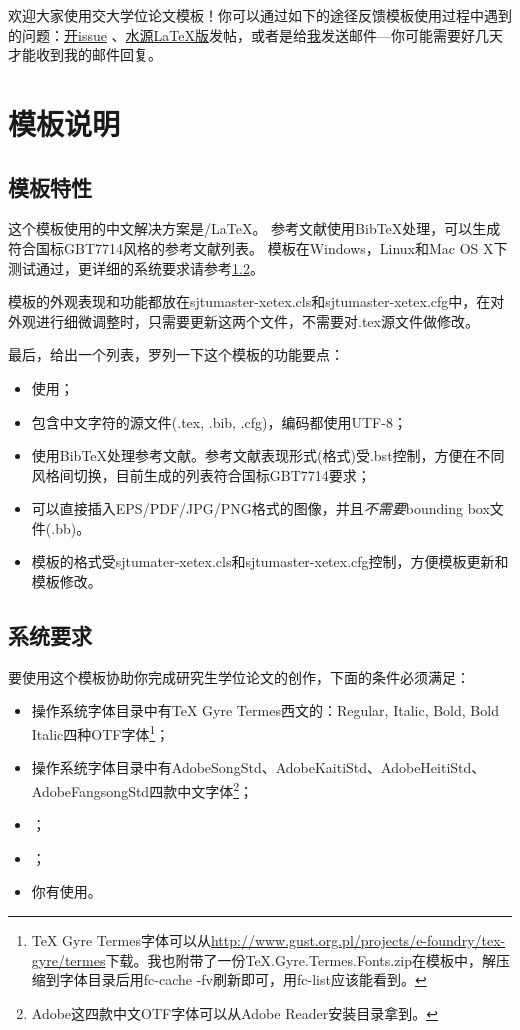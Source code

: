 欢迎大家使用交大学位论文模板！你可以通过如下的途径反馈模板使用过程中遇到的问题：\href{https://github.com/weijianwen/sjtu-thesis-template-latex/issues}{开issue}
、\href{https://bbs.sjtu.edu.cn/bbsdoc?board=TeX_LaTeX}{水源LaTeX版}发帖，或者是给\href{mailto:weijianwen@gmail.com}{我}发送邮件---你可能需要好几天才能收到我的邮件回复。

\section{模板说明}
\subsection{模板特性}
\label{sec:features}

这个模板使用的中文解决方案是\XeTeX/\LaTeX。
参考文献使用BibTeX处理，可以生成符合国标GBT7714风格的参考文献列表。
模板在Windows，Linux和Mac OS X下测试通过，更详细的系统要求请参考\ref{sec:requirements}。

模板的外观表现和功能都放在sjtumaster-xetex.cls和sjtumaster-xetex.cfg中，在对外观进行细微调整时，只需要更新这两个文件，不需要对.tex源文件做修改。

最后，给出一个列表，罗列一下这个模板的功能要点：

\begin{itemize}
\item 使用；
\item 包含中文字符的源文件(.tex, .bib, .cfg)，编码都使用UTF-8；
\item 使用BibTeX处理参考文献。参考文献表现形式(格式)受.bst控制，方便在不同风格间切换，目前生成的列表符合国标GBT7714要求；
\item 可以直接插入EPS/PDF/JPG/PNG格式的图像，并且\emph{不需要}bounding box文件(.bb)。
\item 模板的格式受sjtumater-xetex.cls和sjtumaster-xetex.cfg控制，方便模板更新和模板修改。
\end{itemize}

\subsection{系统要求}
\label{sec:requirements}

要使用这个模板协助你完成研究生学位论文的创作，下面的条件必须满足：

\begin{itemize}
\item 操作系统字体目录中有TeX Gyre Termes西文的：Regular, Italic, Bold, Bold Italic四种OTF字体\footnote{TeX Gyre Termes字体可以从\href{http://www.gust.org.pl/projects/e-foundry/tex-gyre/termes}{http://www.gust.org.pl/projects/e-foundry/tex-gyre/termes}下载。我也附带了一份TeX.Gyre.Termes.Fonts.zip在模板中，解压缩到字体目录后用fc-cache -fv刷新即可，用fc-list应该能看到。}；
\item 操作系统字体目录中有AdobeSongStd、AdobeKaitiStd、AdobeHeitiStd、AdobeFangsongStd四款中文字体\footnote{Adobe这四款中文OTF字体可以从Adobe Reader安装目录拿到。}；
\item {}；
\item {}；
\item 你有使用。
\end{itemize}

